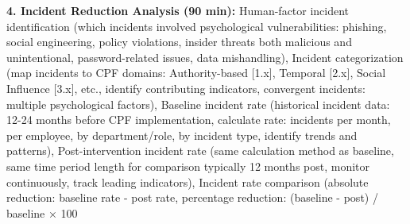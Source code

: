 \documentclass[11pt,a4paper]{article}
\begin{document}
\textbf{4. Incident Reduction Analysis (90 min):} Human-factor incident identification (which incidents involved psychological vulnerabilities: phishing, social engineering, policy violations, insider threats both malicious and unintentional, password-related issues, data mishandling), Incident categorization (map incidents to CPF domains: Authority-based [1.x], Temporal [2.x], Social Influence [3.x], etc., identify contributing indicators, convergent incidents: multiple psychological factors), Baseline incident rate (historical incident data: 12-24 months before CPF implementation, calculate rate: incidents per month, per employee, by department/role, by incident type, identify trends and patterns), Post-intervention incident rate (same calculation method as baseline, same time period length for comparison typically 12 months post, monitor continuously, track leading indicators), Incident rate comparison (absolute reduction: baseline rate - post rate, percentage reduction: (baseline - post) / baseline × 100%
\end{document}
